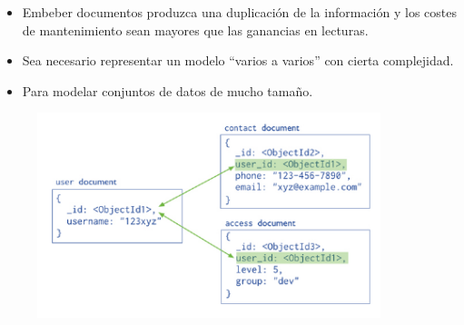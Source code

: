 \documentclass[preprint,12pt]{elsarticle}
\begin{document}
\begin{itemize}

\item Embeber documentos produzca una duplicación de la información y los costes de mantenimiento sean mayores que las ganancias en lecturas.
\item Sea necesario representar un modelo “varios a varios” con cierta complejidad.
\item Para modelar conjuntos de datos de mucho tamaño.

\end{itemize}

\begin{figure}[htb]
	\begin{center}
		\includegraphics[width=10cm]{./IMAGENES/img02.png} %
	\end{center}
\end{figure}
 \cite{MongoDB}
\end{document}
